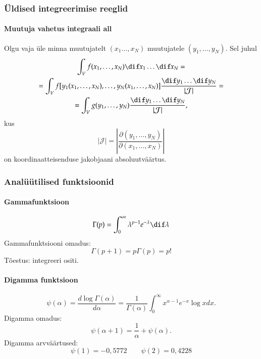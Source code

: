 \documentclass[a4paper]{article}
\numberwithin{equation}{subsection}
\begin{document}
\subsubsection{Üldised integreerimise reeglid}
\paragraph{Muutuja vahetus integraali all}
Olgu vaja üle minna muutujatelt $(x_1 \ldots, x_N)$ muutujatele $(y_1,
\ldots, y_N)$.  Sel juhul
\begin{multline}
\int_V f(x_1, \ldots, x_N) \dif x_1 \ldots \dif x_N =\\
%
  = \int_V f[ y_1(x_1, \ldots, x_N), \ldots, y_N(x_1, \ldots, x_N) ]
    \frac{\dif y_1 \ldots \dif y_N}{|\mathcal{J}|} =\\
%
  = \int_V g(y_1, \ldots, y_N) 
    \frac{\dif y_1 \ldots \dif y_N}{|\mathcal{J}|},
\end{multline}
kus
\begin{equation}
|\mathcal{J}| = \left| \frac{\partial(y_1, \ldots, y_N)}
  {\partial(x_1, \ldots, x_N)} \right|
\end{equation}
on koordinaatteisenduse jakobjaani absoluutväärtus.


\subsubsection{Analüütilised funktsioonid}

\paragraph{Gammafunktsioon}
\begin{equation}
\Gamma(p) = 
  \int_0^\infty \lambda^{p-1} e^{-\lambda} \dif\lambda
\end{equation}
Gammafunktsiooni omadus:
\begin{equation}
\Gamma(p+1) = p \Gamma(p) = p!
\end{equation}
Tõestus: integreeri ositi.

\paragraph{Digamma funktsioon}
\begin{equation}
\psi(\alpha) = \frac{d \log \Gamma(\alpha)}{d \alpha} =
  \frac{1}{\Gamma(\alpha)}
  \int_0^\infty x^{\alpha-1} e^{-x} \log x dx.
\end{equation}
Digamma omadus:
\begin{equation}
\psi(\alpha+1) = \frac{1}{\alpha} + \psi(\alpha).
\end{equation}
Digamma arvväärtused:
\begin{equation}
\psi(1) = -0,5772 \qquad \psi(2) = 0,4228
\end{equation}
\end{document}
